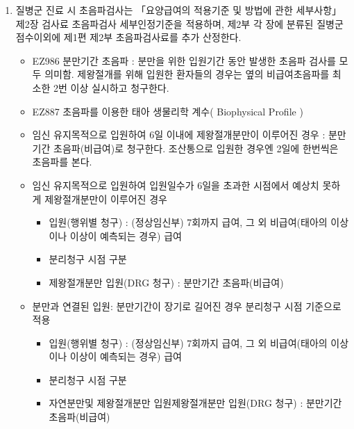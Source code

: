 \begin{enumerate}[1.]
\item 질병군 진료 시 초음파검사는 「요양급여의 적용기준 및 방법에 관한 세부사항」제2장 검사료 초음파검사 세부인정기준을 적용하며,  제2부 각 장에 분류된 질병군 점수이외에 제1편 제2부 초음파검사료를 추가 산정한다. 
	\begin{itemize}\tightlist
	\item EZ986 분만기간 초음파 : 분만을 위한 입원기간 동안 발생한 초음파 검사를 모두 의미함. 제왕절개를 위해 입원한 환자들의 경우는 옆의 비급여초음파를 최소한 2번 이상 실시하고 청구한다.
	\item EZ887 초음파를 이용한 태아 생물리학 계수( Biophysical Profile )
	\item 임신 유지목적으로 입원하여 6일 이내에 제왕절개분만이 이루어진 경우 : 분만기간 초음파(비급여)로 청구한다. 조산통으로 입원한 경우엔 2일에 한번씩은 초음파를 본다.
	\item 임신 유지목적으로 입원하여 입원일수가 6일을 초과한 시점에서 예상치 못하게 제왕절개분만이 이루어진 경우 
		\begin{itemize}\tightlist
		\item 입원(행위별 청구) : (정상임신부) 7회까지 급여, 그 외 비급여(태아의 이상이나 이상이 예측되는 경우) 급여
		\item 분리청구 시점 구분
		\item 제왕절개분만 입원(DRG 청구) : 분만기간 초음파(비급여)
         \end{itemize}                               
	\item 분만과 연결된 입원: 분만기간이 장기로 길어진 경우 분리청구 시점 기준으로 적용
		\begin{itemize}\tightlist
		\item 입원(행위별 청구) : (정상임신부) 7회까지 급여, 그 외 비급여(태아의 이상이나 이상이 예측되는 경우) 급여
		\item 분리청구 시점 구분
		\item 자연분만및 제왕절개분만 입원제왕절개분만 입원(DRG 청구) : 분만기간 초음파(비급여)
         \end{itemize} 	
     \end{itemize}

\end{enumerate}
